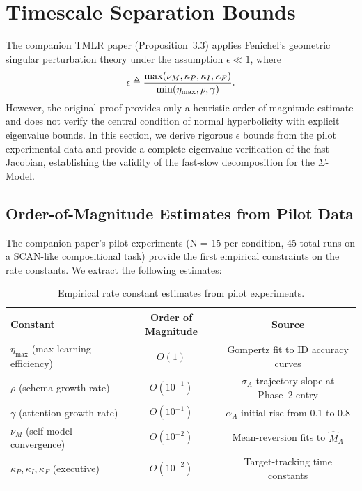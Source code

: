 
\section{Timescale Separation Bounds}
\label{sec:timescale}

The companion TMLR paper (Proposition~3.3) applies Fenichel's geometric
singular perturbation theory under the assumption $\epsilon \ll 1$, where
\[
\epsilon \triangleq \frac{\max(\nu_M, \kappa_P, \kappa_I, \kappa_F)}
{\min(\eta_{\max}, \rho, \gamma)}.
\]
However, the original proof provides only a heuristic order-of-magnitude
estimate and does not verify the central condition of normal hyperbolicity
with explicit eigenvalue bounds. In this section, we derive rigorous
$\epsilon$ bounds from the pilot experimental data and provide a complete
eigenvalue verification of the fast Jacobian, establishing the validity
of the fast-slow decomposition for the $\Sigma$-Model.

\subsection{Order-of-Magnitude Estimates from Pilot Data}

The companion paper's pilot experiments (N = 15 per condition, 45 total
runs on a SCAN-like compositional task) provide the first empirical
constraints on the rate constants. We extract the following estimates:

\begin{table}[h]
\centering
\begin{tabular}{lcc}
\toprule
Constant & Order of Magnitude & Source \\
\midrule
$\eta_{\max}$ (max learning efficiency) & $O(1)$ & Gompertz fit to ID accuracy curves \\
$\rho$ (schema growth rate) & $O(10^{-1})$ & $\sigma_A$ trajectory slope at Phase~2 entry \\
$\gamma$ (attention growth rate) & $O(10^{-1})$ & $\alpha_A$ initial rise from 0.1 to 0.8 \\
$\nu_M$ (self-model convergence) & $O(10^{-2})$ & Mean-reversion fits to $\hat{M}_A$ \\
$\kappa_P, \kappa_I, \kappa_F$ (executive) & $O(10^{-2})$ & Target-tracking time constants \\
\bottomrule
\end{tabular}
\caption{Empirical rate constant estimates from pilot experiments.}
\label{tab:rate-estimates}
\end{table}

